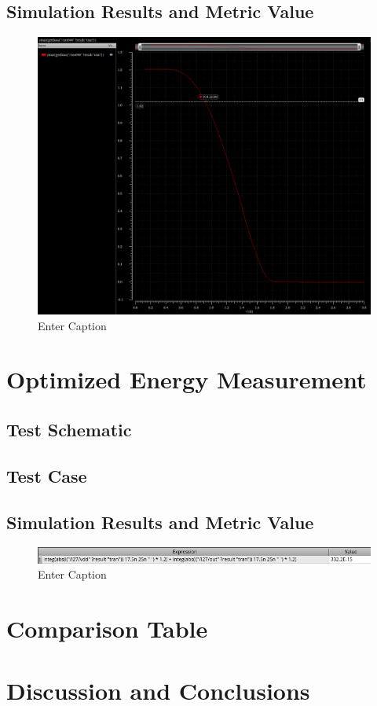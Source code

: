 \documentclass[12pt]{article}
\begin{document}
\newpage

\subsection{Simulation Results and Metric Value}

\begin{figure}
    \centering
    \includegraphics[width=0.5\linewidth]{writeup//figures/max_frequencies_optimized.png}
    \caption{Enter Caption}
\end{figure}



\newpage

\section{Optimized Energy Measurement}
\subsection{Test Schematic}



\newpage

\subsection{Test Case}



\newpage

\subsection{Simulation Results and Metric Value}

\begin{figure}
    \centering
    \includegraphics[width=0.5\linewidth]{writeup//figures/optimized_energy_val.png}
    \caption{Enter Caption}
\end{figure}
\newpage

\section{Comparison Table}



\newpage

\section{Discussion and Conclusions}
\end{document}
